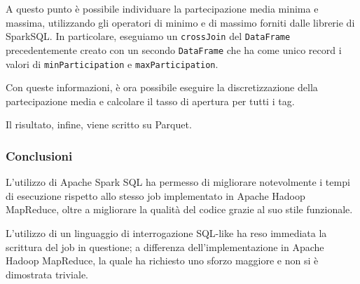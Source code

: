 \documentclass[10pt]{article}
\begin{document}
A questo punto è possibile individuare la partecipazione media minima e massima, utilizzando gli operatori di minimo e di massimo forniti dalle librerie di SparkSQL. In particolare, eseguiamo un \texttt{crossJoin} del \texttt{DataFrame} precedentemente creato con un secondo \texttt{DataFrame} che ha come unico record i valori di \texttt{minParticipation} e \texttt{maxParticipation}.

Con queste informazioni, è ora possibile eseguire la discretizzazione della partecipazione media e calcolare il tasso di apertura per tutti i tag.

Il risultato, infine, viene scritto su Parquet.

\subsubsection{Conclusioni}

L'utilizzo di Apache Spark SQL ha permesso di migliorare notevolmente i tempi di esecuzione rispetto allo stesso job implementato in Apache Hadoop MapReduce, oltre a migliorare la qualità del codice grazie al suo stile funzionale.

L'utilizzo di un linguaggio di interrogazione SQL-like ha reso immediata la scrittura del job in questione; a differenza dell'implementazione in Apache Hadoop MapReduce, la quale ha richiesto uno sforzo maggiore e non si è dimostrata triviale.
\end{document}
